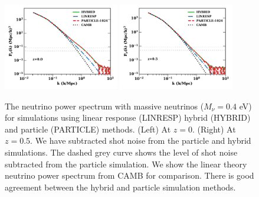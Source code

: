 \documentclass[useAMS, usenatbib]{mnras}
\begin{document}
\begin{figure}
\includegraphics[width=0.45\textwidth]{nuplots/pks-nu-1.pdf}
\includegraphics[width=0.45\textwidth]{nuplots/pks-nu-0_6667.pdf}
  \caption{The neutrino power spectrum with massive neutrinos ($M_\nu = 0.4$ eV) for simulations using linear response (LINRESP) hybrid (HYBRID) and particle (PARTICLE) methods. (Left) At $z=0$. (Right) At $z=0.5$. We have subtracted shot noise from the particle and hybrid simulations. The dashed grey curve shows the level of shot noise subtracted from the particle simulation. We show the linear theory neutrino power spectrum from CAMB for comparison. There is good agreement between the hybrid and particle simulation methods.}
  \label{fig:neutrino_power}
\end{figure}
\end{document}
